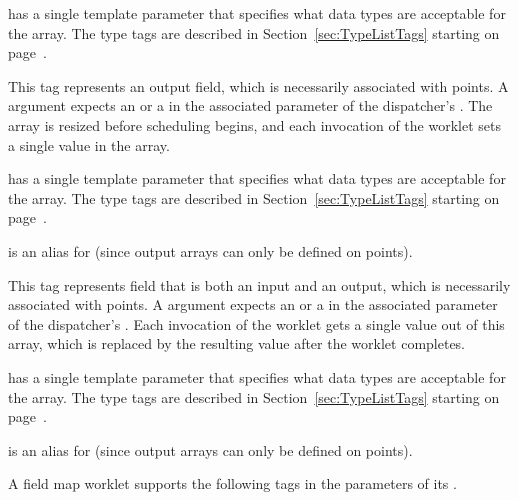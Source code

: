 \begin{description}
   has a single template parameter that specifies what
  data types are acceptable for the array. The type tags are described in
  Section~\ref{sec:TypeListTags} starting on page~\pageref{TypeTagList}.

\item[\sigtag{FieldOutPoint}] This tag represents an output field, which is
  necessarily associated with points. A  argument
  expects an  or a
   in the associated parameter of the
  dispatcher's . The array is resized before scheduling
  begins, and each invocation of the worklet sets a single value in the
  array.

   has a single template parameter that specifies what
  data types are acceptable for the array. The type tags are described in
  Section~\ref{sec:TypeListTags} starting on page~\pageref{TypeTagList}.

   is an alias for  (since output
  arrays can only be defined on points).

\item[\sigtag{FieldInOutPoint}] This tag represents field that is both an
  input and an output, which is necessarily associated with points. A
   argument expects an 
  or a  in the associated parameter of
  the dispatcher's . Each invocation of the worklet gets a
  single value out of this array, which is replaced by the resulting value
  after the worklet completes.

   has a single template parameter that specifies
  what data types are acceptable for the array. The type tags are described
  in Section~\ref{sec:TypeListTags} starting on page~\pageref{TypeTagList}.

   is an alias for  (since output
  arrays can only be defined on points).

  \commoncontrolsignaturetags
\end{description}

A field map worklet supports the following tags in the parameters of its
\executionsignature.

